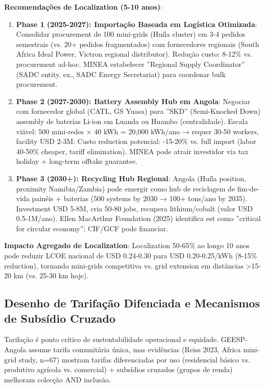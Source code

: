 \documentclass[12pt, a4paper]{article}
\begin{document}
\textbf{Recomendações de Localization (5-10 anos)}:

\begin{enumerate}
\item \textbf{Phase 1 (2025-2027): Importação Baseada em Logística Otimizada}: Consolidar procurement de 100 mini-grids (Huíla cluster) em 3-4 pedidos semestrais (vs. 20+ pedidos fragmentados) com fornecedores regionais (South Africa Ideal Power, Victron regional distributor). Redução custo: 8-12\% vs. procurement ad-hoc. MINEA estabelecer ''Regional Supply Coordinator'' (SADC entity, ex., SADC Energy Secretariat) para coordenar bulk procurement.

\item \textbf{Phase 2 (2027-2030): Battery Assembly Hub em Angola}: Negociar com fornecedor global (CATL, GS Yuasa) para ''SKD'' (Semi-Knocked Down) assembly de baterias Li-ion em Luanda ou Huambo (centralidade). Escala viável: 500 mini-redes × 40 kWh = 20,000 kWh/ano → requer 30-50 workers, facility USD 2-3M. Custo reduction potencial: -15-20\% vs. full import (labor 40-50\% cheaper, tariff elimination). MINEA pode atrair investidor via tax holiday + long-term offtake guarantee.

\item \textbf{Phase 3 (2030+): Recycling Hub Regional}: Angola (Huíla position, proximity Namibia/Zambia) pode emergir como hub de reciclagem de fim-de-vida painéis + baterias (500 systems by 2030 → 100+ tons/ano by 2035). Investment USD 5-8M, cria 50-80 jobs, recupera lithium/cobalt (valor USD 0.5-1M/ano). Ellen MacArthur Foundation (2025) identifica est como ''critical for circular economy''; CIF/GCF pode financiar.
\end{enumerate}

\textbf{Impacto Agregado de Localization}: Localization 50-65\% ao longo 10 anos pode reduzir LCOE nacional de USD 0.24-0.30 para USD 0.20-0.25/kWh (8-15\% reduction), tornando mini-grids competitiva vs. grid extension em distâncias >15-20 km (vs. 25-30 km hoje).

\subsection{Desenho de Tarifação Difenciada e Mecanismos de Subsídio Cruzado}

Tarifação é ponto crítico de sustentabilidade operacional e equidade. GEESP-Angola assume tarifa comunitária única, mas evidências (Reiss 2023, Africa mini-grid study, n=67) mostram tarifas diferenciadas por uso (residencial básico vs. produtivo agrícola vs. comercial) + subsídios cruzados (grupos de renda) melhoram colecção AND inclusão.
\end{document}

